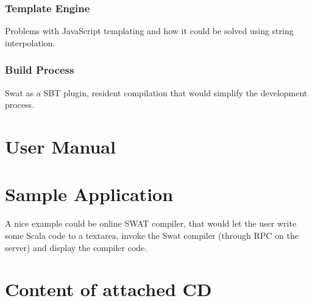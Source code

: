 \documentclass[12pt,a4paper]{report}
\begin{document}
\subsection{Template Engine}

Problems with JavaScript templating and how it could be solved using string interpolation.

\subsection{Build Process}

Swat as a SBT plugin, resident compilation that would simplify the development process.



\def\bibname{Bibliography}





\appendix
\appendixpage
\addappheadtotoc

\chapter{User Manual}

\chapter{Sample Application}

A nice example could be online SWAT compiler, that would let the user write some Scala code to a textarea, invoke the Swat compiler (through RPC on the server) and display the compiler code.



\chapter{Content of attached CD}





\printnomenclature
\end{document}
